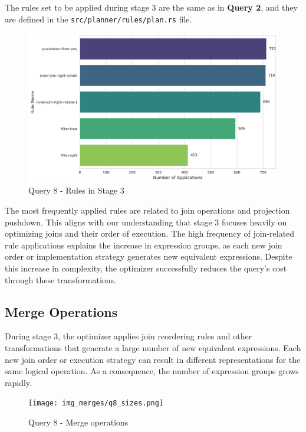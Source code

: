 \documentclass[a4paper,12pt]{scrreprt}
\begin{document}
The rules set to be applied during stage 3 are the same as in \textbf{Query 2}, and they are defined in the \texttt{src/planner/rules/plan.rs} file. \\

\begin{figure}[H]
    \centering
    \includegraphics[width=0.95\linewidth]{img/img_rule_mostpop/top_5_rules_stage3_q8.png}
    \caption{Query 8 - Rules in Stage 3}
    \label{fig:rules8}
\end{figure}

The most frequently applied rules are related to join operations and projection pushdown. This aligns with our understanding that stage 3 focuses heavily on optimizing joins and their order of execution.
The high frequency of join-related rule applications explains the increase in expression groups, as each new join order or implementation strategy generates new equivalent expressions. Despite this increase in complexity, the optimizer successfully reduces the query's cost through these transformations.


\subsection{Merge Operations}
During stage 3, the optimizer applies join reordering rules and other transformations that generate a large number of new equivalent expressions. Each new join order or execution strategy can result in different representations for the same logical operation. As a consequence, the number of expression groups grows rapidly. \\

\begin{figure}[H]
    \centering
    \texttt{[image: img\_merges/q8\_sizes.png]}
    \caption{Query 8 - Merge operations}
    \label{fig:hist8}
\end{figure}
\end{document}
